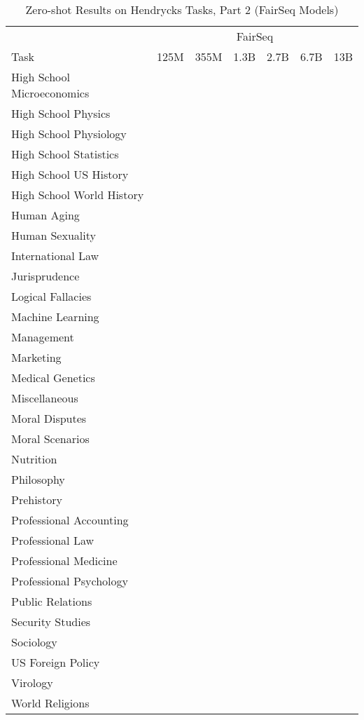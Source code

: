 \documentclass[11pt]{article}
\begin{document}
{\begin{landscape}
\begin{table*}    
\centering \begin{tabular}{l c c c c c c }
 & \multicolumn{6}{c}{FairSeq} \\
Task & 125M & 355M & 1.3B & 2.7B & 6.7B & 13B\\ \toprule
High School Microeconomics &  &  &  &  &  &  \\ 
High School Physics &  &  &  &  &  &  \\ 
High School Physiology &  &  &  &  &  &  \\ 
High School Statistics &  &  &  &  &  &  \\ 
High School US History &  &  &  &  &  &  \\ 
High School World History &  &  &  &  &  &  \\ 
Human Aging &  &  &  &  &  &  \\ 
Human Sexuality &  &  &  &  &  &  \\
International Law &  &  &  &  &  &  \\
Jurisprudence &  &  &  &  &  &  \\
Logical Fallacies &  &  &  &  &  &  \\ 
Machine Learning &  &  &  &  &  &  \\ 
Management &  &  &  &  &  &  \\ 
Marketing &  &  &  &  &  &  \\ 
Medical Genetics &  &  &  &  &  &  \\ 
Miscellaneous &  &  &  &  &  &  \\ 
Moral Disputes &  &  &  &  &  &  \\ 
Moral Scenarios &  &  &  &  &  &  \\ 
Nutrition &  &  &  &  &  &  \\ 
Philosophy &  &  &  &  &  &  \\ 
Prehistory &  &  &  &  &  &  \\ 
Professional Accounting &  &  &  &  &  &  \\ 
Professional Law &  &  &  &  &  &  \\ 
Professional Medicine &  &  &  &  &  &  \\ 
Professional Psychology &  &  &  &  &  &  \\ 
Public Relations &  &  &  &  &  &  \\ 
Security Studies &  &  &  &  &  &  \\ 
Sociology &  &  &  &  &  &  \\ 
US Foreign Policy &  &  &  &  &  &  \\ 
Virology &  &  &  &  &  &  \\ 
World Religions &  &  &  &  &  &  \\ 
\bottomrule
\end{tabular}
\caption{Zero-shot Results on Hendrycks Tasks, Part 2 (FairSeq Models)}
\label{tab:hendrycks-fair2}
\end{table*}
\end{landscape}}
\end{document}
